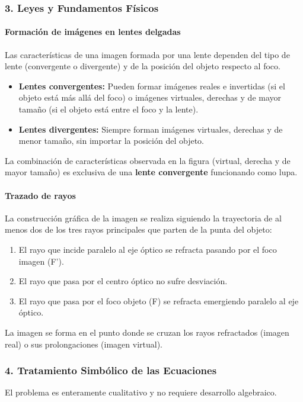 \subsubsection*{3. Leyes y Fundamentos Físicos}
\paragraph*{Formación de imágenes en lentes delgadas}
Las características de una imagen formada por una lente dependen del tipo de lente (convergente o divergente) y de la posición del objeto respecto al foco.
\begin{itemize}
    \item \textbf{Lentes convergentes:} Pueden formar imágenes reales e invertidas (si el objeto está más allá del foco) o imágenes virtuales, derechas y de mayor tamaño (si el objeto está entre el foco y la lente).
    \item \textbf{Lentes divergentes:} Siempre forman imágenes virtuales, derechas y de menor tamaño, sin importar la posición del objeto.
\end{itemize}
La combinación de características observada en la figura (virtual, derecha y de mayor tamaño) es exclusiva de una \textbf{lente convergente} funcionando como lupa.

\paragraph*{Trazado de rayos}
La construcción gráfica de la imagen se realiza siguiendo la trayectoria de al menos dos de los tres rayos principales que parten de la punta del objeto:
\begin{enumerate}
    \item El rayo que incide paralelo al eje óptico se refracta pasando por el foco imagen (F').
    \item El rayo que pasa por el centro óptico no sufre desviación.
    \item El rayo que pasa por el foco objeto (F) se refracta emergiendo paralelo al eje óptico.
\end{enumerate}
La imagen se forma en el punto donde se cruzan los rayos refractados (imagen real) o sus prolongaciones (imagen virtual).

\subsubsection*{4. Tratamiento Simbólico de las Ecuaciones}
El problema es enteramente cualitativo y no requiere desarrollo algebraico.


